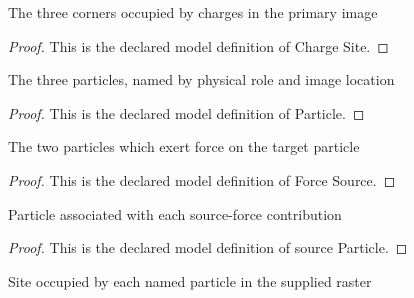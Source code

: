 \begin{definition}
  \label{def:physics:phyx-mini-0895:phyxminiproblems-problemphyxmini0895-chargesite}
  The three corners occupied by charges in the primary image
\end{definition}
\begin{proof}
  This is the declared model definition of Charge Site.
\end{proof}
\begin{definition}[Particle]
  \label{def:physics:phyx-mini-0895:phyxminiproblems-problemphyxmini0895-particle}
  The three particles, named by physical role and image location
\end{definition}
\begin{proof}
  This is the declared model definition of Particle.
\end{proof}
\begin{definition}
  \label{def:physics:phyx-mini-0895:phyxminiproblems-problemphyxmini0895-forcesource}
  The two particles which exert force on the target particle
\end{definition}
\begin{proof}
  This is the declared model definition of Force Source.
\end{proof}
\begin{definition}
  \label{def:physics:phyx-mini-0895:phyxminiproblems-problemphyxmini0895-sourceparticle}
  Particle associated with each source-force contribution
\end{definition}
\begin{proof}
  This is the declared model definition of source Particle.
\end{proof}
\begin{definition}
  \label{def:physics:phyx-mini-0895:phyxminiproblems-problemphyxmini0895-expectedparticlesite}
  Site occupied by each named particle in the supplied raster
\end{definition}
